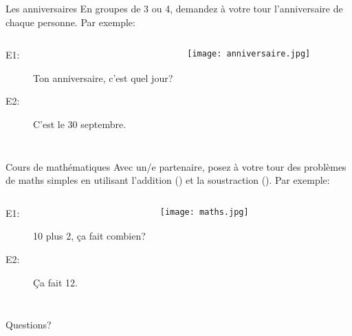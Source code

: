 \documentclass{beamer}
\begin{document}
  \begin{frame}{Les anniversaires}
    En groupes de 3 ou 4, demandez à votre tour l'anniversaire de chaque personne.
    Par exemple: \\
    \begin{columns}
        \begin{description}
          \item[E1:] Ton anniversaire, c'est quel jour?
          \item[] 
          \item[E2:] C'est le 30 septembre.
          \item[] 
        \end{description}
        \begin{center}
          \texttt{[image: anniversaire.jpg]}
        \end{center}
    \end{columns}
  \end{frame}

  \begin{frame}{Cours de mathématiques}
    Avec un/e partenaire, posez à votre tour des problèmes de maths simples en utilisant l'addition () et la soustraction ().
    Par exemple: \\
    \begin{columns}
        \begin{description}
          \item[E1:] 10 plus 2, ça fait combien?
          \item[] 
          \item[E2:] Ça fait 12.
          \item[] 
        \end{description}
        \begin{center}
          \texttt{[image: maths.jpg]}
        \end{center}
    \end{columns}
  \end{frame}

  \begin{frame}{}
    \begin{center}
      \Large Questions?
    \end{center}
  \end{frame}
\end{document}
